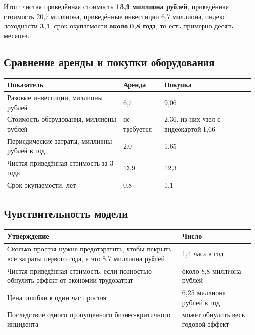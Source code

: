 \documentclass[11pt]{article}
\begin{document}
Итог: чистая приведённая стоимость \textbf{13,9 миллиона рублей}, приведённая
стоимость 20,7 миллиона, приведённые инвестиции 6,7 миллиона, индекс
доходности \textbf{3,1}, срок окупаемости \textbf{около 0,8 года}, то есть
примерно десять месяцев.

\subsection{Сравнение аренды и покупки оборудования}
\begin{longtable}{|L{7.6cm}|L{4cm}|L{4.4cm}|}
\hline
\textbf{Показатель} & \textbf{Аренда} & \textbf{Покупка} \\ \hline
Разовые инвестиции, миллионы рублей & 6,7 & 9,06 \\ \hline
Стоимость оборудования, миллионы рублей & не требуется & 2,36, из них узел с видеокартой 1,66 \\ \hline
Периодические затраты, миллионы рублей в год & 2,0 & 1,65 \\ \hline
Чистая приведённая стоимость за 3 года & 13,9 & 12,3 \\ \hline
Срок окупаемости, лет & 0,8 & 1,1 \\ \hline
\end{longtable}

\subsection{Чувствительность модели}
\begin{longtable}{|L{9.6cm}|L{6.9cm}|}
\hline
\textbf{Утверждение} & \textbf{Число} \\ \hline
Сколько простоя нужно предотвратить, чтобы покрыть все затраты первого года, а это 8,7 миллиона рублей & 1,4 часа в год \\ \hline
Чистая приведённая стоимость, если полностью обнулить эффект от экономии трудозатрат & около 8,8 миллиона рублей \\ \hline
Цена ошибки в один час простоя & 6,25 миллиона рублей в год \\ \hline
Последствие одного пропущенного бизнес-критичного инцидента & может обнулить весь годовой эффект \\ \hline
\end{longtable}
\end{document}
